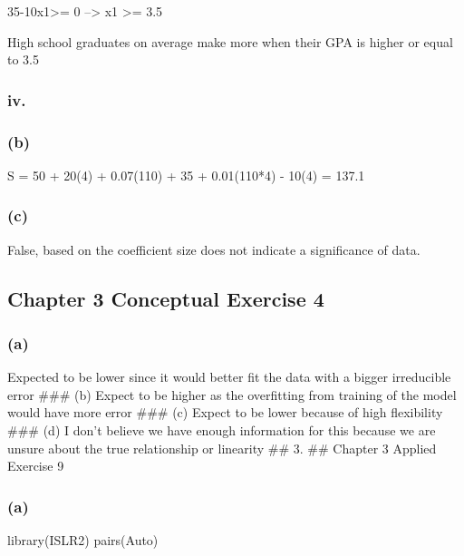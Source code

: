 \documentclass[
]{article}
\newenvironment{Shaded}{\begin{snugshade}}{\end{snugshade}}
\newcommand{\FunctionTok}[1]{\textcolor[rgb]{0.00,0.00,0.00}{#1}}
\newcommand{\NormalTok}[1]{#1}
\begin{document}
35-10x1\textgreater= 0 --\textgreater{} x1 \textgreater= 3.5

High school graduates on average make more when their GPA is higher or
equal to 3.5

\hypertarget{iv.}{%
\subsubsection{iv.}\label{iv.}}

\hypertarget{b}{%
\subsubsection{(b)}\label{b}}

S = 50 + 20(4) + 0.07(110) + 35 + 0.01(110*4) - 10(4) = 137.1

\hypertarget{c}{%
\subsubsection{(c)}\label{c}}

False, based on the coefficient size does not indicate a significance of
data.

\hypertarget{chapter-3-conceptual-exercise-4}{%
\subsection{Chapter 3 Conceptual Exercise
4}\label{chapter-3-conceptual-exercise-4}}

\hypertarget{a-1}{%
\subsubsection{(a)}\label{a-1}}

Expected to be lower since it would better fit the data with a bigger
irreducible error \#\#\# (b) Expect to be higher as the overfitting from
training of the model would have more error \#\#\# (c) Expect to be
lower because of high flexibility \#\#\# (d) I don't believe we have
enough information for this because we are unsure about the true
relationship or linearity \#\# 3. \#\# Chapter 3 Applied Exercise 9

\hypertarget{a-2}{%
\subsubsection{(a)}\label{a-2}}

\begin{Shaded}
\begin{Highlighting}[]
\FunctionTok{library}\NormalTok{(ISLR2)}
\FunctionTok{pairs}\NormalTok{(Auto)}
\end{Highlighting}
\end{Shaded}
\end{document}
